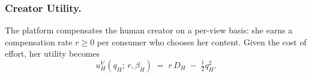 



\subsubsection*{Creator Utility.}

The platform compensates the human creator on a per-view basis: she 
earns a compensation rate $r \geq 0$ per consumer who chooses her 
content. Given the cost of effort, her utility becomes
\begin{equation}\label{eq:uhV}
u_H^{V}(q_H;\,r,\beta_H) 
\;=\; r\,D_H \;-\; \tfrac{1}{2}q_H^{2}.
\end{equation}

